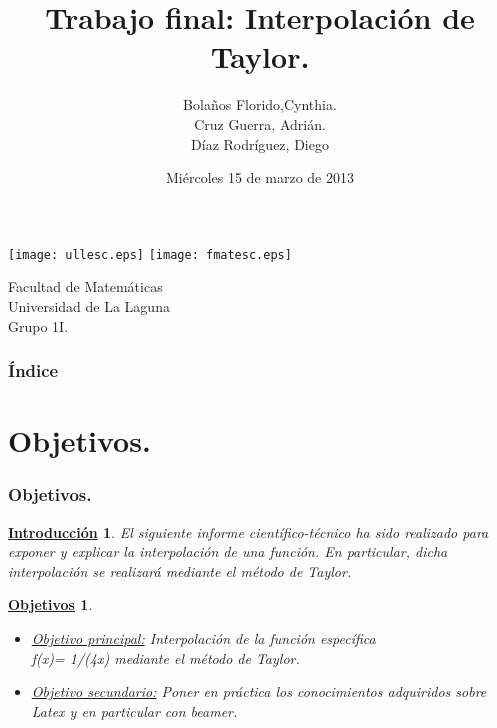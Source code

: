 \documentclass{beamer}
\title[Presentación con Beamer]{Trabajo final: Interpolación de Taylor.}
\author[Técnicas Experimentales]{Bolaños Florido,Cynthia. \\
Cruz Guerra, Adrián.\\
Díaz Rodríguez, Diego}
\date[15-05-2013]{Miércoles 15 de marzo de 2013}
\newtheorem{descripcion de los experimentos}{\underline {Descripcion de los experimentos}}
\newtheorem{introduccion}{\underline {Introducción}}
\newtheorem{objetivos}{\underline {Objetivos}}
\begin{document}
\begin{frame}

\texttt{[image: ullesc.eps]}
\hspace*{7.5cm}
\texttt{[image: fmatesc.eps]}
\titlepage

  \begin{scriptsize}
    \begin{center}
     Facultad de Matemáticas \\
     Universidad de La Laguna \\
     Grupo 1I.
    \end{center}
  \end{scriptsize}
\end{frame}


\begin{frame}
  \frametitle{Índice}  
  \tableofcontents[pausesections]
\end{frame}


\section{Objetivos.}
\begin{frame}
\frametitle{Objetivos.}
 \tableofcontents[pausesections]
\begin{introduccion}
El siguiente informe científico-técnico ha sido realizado para exponer y explicar la interpolación de una función. 
En particular, dicha interpolación se realizará mediante el método de Taylor.
 \tableofcontents[pausesections]
\end{introduccion}
\begin{objetivos}
\begin {itemize}
\item \underline {Objetivo principal:} Interpolación  de la función específica\\ 
f(x)= 1/(4x) mediante el método de Taylor.\\
\item \underline {Objetivo secundario:} Poner en práctica los conocimientos adquiridos sobre Latex y en particular con beamer.
\end {itemize}
\end{objetivos}
\end{frame}
\end{document}
